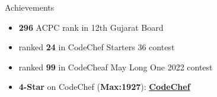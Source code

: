 \documentclass{resume} %
\begin{document}
\begin{rSection}{Achievements} 
\begin{itemize}
    \item   \textbf{296} ACPC rank in 12th Gujarat Board
    \item   ranked \textbf{24} in CodeChef Starters 36 contest
    \item   ranked \textbf{99} in CodeCheaf May Long One 2022
contest
    \item   \textbf{4-Star} on CodeChef (\textbf{Max:1927}):
    \href{https://www.codechef.com/users/checking}{\textbf{CodeChef}} 
\end{itemize}


\end{rSection}
\end{document}
